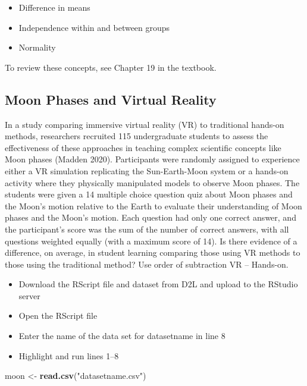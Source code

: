 \documentclass[
]{report}
\newenvironment{Shaded}{\begin{snugshade}}{\end{snugshade}}
\newcommand{\FunctionTok}[1]{\textcolor[rgb]{0.13,0.29,0.53}{\textbf{#1}}}
\newcommand{\NormalTok}[1]{#1}
\newcommand{\OtherTok}[1]{\textcolor[rgb]{0.56,0.35,0.01}{#1}}
\newcommand{\StringTok}[1]{\textcolor[rgb]{0.31,0.60,0.02}{#1}}
\begin{document}
\begin{itemize}
\item
  Difference in means
\item
  Independence within and between groups
\item
  Normality
\end{itemize}

To review these concepts, see Chapter 19 in the textbook.

\subsection{Moon Phases and Virtual Reality}\label{moon-phases-and-virtual-reality}

In a study comparing immersive virtual reality (VR) to traditional hands-on methods, researchers recruited 115 undergraduate students to assess the effectiveness of these approaches in teaching complex scientific concepts like Moon phases (Madden 2020). Participants were randomly assigned to experience either a VR simulation replicating the Sun-Earth-Moon system or a hands-on activity where they physically manipulated models to observe Moon phases. The students were given a 14 multiple choice question quiz about Moon phases and the Moon's motion relative to the Earth to evaluate their understanding of Moon phases and the Moon's motion. Each question had only one correct answer, and the participant's score was the sum of the number of correct answers, with all questions weighted equally (with a maximum score of 14). Is there evidence of a difference, on average, in student learning comparing those using VR methods to those using the traditional method? Use order of subtraction VR -- Hands-on.

\begin{itemize}
\item
  Download the RScript file and dataset from D2L and upload to the RStudio server
\item
  Open the RScript file
\item
  Enter the name of the data set for datasetname in line 8
\item
  Highlight and run lines 1--8
\end{itemize}

\begin{Shaded}
\begin{Highlighting}[]
\NormalTok{moon }\OtherTok{\textless{}{-}} \FunctionTok{read.csv}\NormalTok{(}\StringTok{"datasetname.csv"}\NormalTok{)}
\end{Highlighting}
\end{Shaded}
\end{document}
